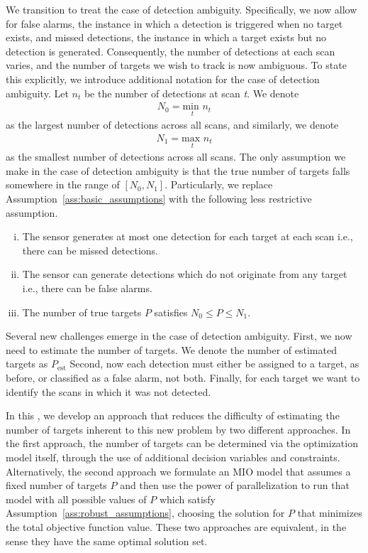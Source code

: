 We transition to treat the case of detection ambiguity. Specifically, we now allow for false alarms, the instance in which a detection is triggered when no target exists, and missed detections, the instance in which a target exists but no detection is generated. Consequently, the number of detections at each scan varies, and the number of targets we wish to track is now ambiguous. To state this explicitly, we introduce additional notation for the case of detection ambiguity. Let $n_{t}$ be the number of detections at scan \textit{t}. We denote 
\begin{align*}
N_{0} = \underset{t}{\text{min }} n_{t}
\end{align*}
as the largest number of detections across all scans, and similarly, we denote
\begin{align*}
N_{1} = \underset{t}{\text{max }}  n_{t}
\end{align*}
as the smallest number of detections across all scans. The only assumption we make in the case of detection ambiguity is that the true number of targets falls somewhere in the range of $[N_{0},N_{1}]$. Particularly, we replace Assumption~\ref{ass:basic_assumptions} with the following less restrictive assumption.
\begin{assumption}\label{ass:robust_assumptions}
\leavevmode
\begin{enumerate}[(i)]
\item The sensor generates at most one detection for each target
 at each scan i.e., there can be missed detections.
\item The sensor can generate detections which do not originate from any target
i.e., there can be false alarms.
\item The number of true targets $P$ satisfies $N_0\leq P \leq N_1$.
\end{enumerate}
\end{assumption}

Several new challenges emerge in the case of detection ambiguity. First, we now need to estimate the number of targets. We denote the number of estimated targets as $P_{\text{est}}$ Second, now each detection must either be assigned to a target, as before, or classified as a false alarm, not both. Finally, for each target we want to identify the scans in which it was not detected. 

In this \mytitle, we develop an approach that reduces the difficulty of estimating the number of targets inherent to this new problem by two different approaches.  In the first approach, the number of targets can be determined via the optimization model itself, through the use of additional decision variables and constraints. 
Alternatively, the second approach  we formulate an MIO model that assumes a fixed number of targets $P$ and then use the power of parallelization to run that model with all possible values of $P$ which satisfy Assumption~\ref{ass:robust_assumptions}, choosing the solution for $P$ that minimizes the total objective function value. These two approaches are equivalent, in the sense they have the same optimal solution set.  


